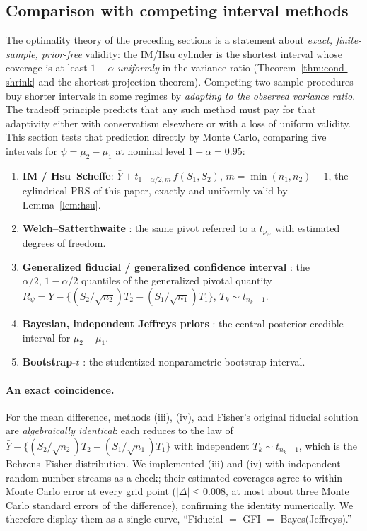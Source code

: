 \documentclass[12pt]{article}
\begin{document}
\subsection{Comparison with competing interval methods}
\label{sec:comparison}

The optimality theory of the preceding sections is a statement
about \emph{exact, finite-sample, prior-free} validity: the IM/Hsu
cylinder is the shortest interval whose coverage is at least \(1-\alpha\)
\emph{uniformly} in the variance ratio (Theorem~\ref{thm:cond-shrink} and the
shortest-projection theorem).  Competing two-sample procedures buy shorter
intervals in some regimes by \emph{adapting to the observed variance ratio}.  The
tradeoff principle predicts that any such method must pay for that adaptivity
either with conservatism elsewhere or with a loss of uniform validity.  This
section tests that prediction directly by Monte Carlo, comparing five intervals
for \(\psi=\mu_2-\mu_1\) at nominal level \(1-\alpha=0.95\):

\begin{enumerate}[label=(\roman*),itemsep=2pt]
\item \textbf{IM / Hsu--Scheffe}: \(\bar Y\pm t_{1-\alpha/2,m}\,f(S_1,S_2)\),
      \(m=\min(n_1,n_2)-1\), the cylindrical PRS of this paper, exactly and
      uniformly valid by Lemma~\ref{lem:hsu}.
\item \textbf{Welch--Satterthwaite} \citep{Welch1947,Satterthwaite1946}: the same
      pivot referred to a \(t_{\nu_W}\) with estimated degrees of freedom.
\item \textbf{Generalized fiducial / generalized confidence interval}
      \citep{Weerahandi1993}: the \(\alpha/2,\,1-\alpha/2\) quantiles of the
      generalized pivotal quantity
      \(R_\psi=\bar Y-\{(S_2/\sqrt{n_2})T_2-(S_1/\sqrt{n_1})T_1\}\),
      \(T_k\sim t_{n_k-1}\).
\item \textbf{Bayesian, independent Jeffreys priors} \citep{GhoshKim2001}: the
      central posterior credible interval for \(\mu_2-\mu_1\).
\item \textbf{Bootstrap-\(t\)} \citep{EfronTibshirani1993}: the studentized
      nonparametric bootstrap interval.
\end{enumerate}

\paragraph{An exact coincidence.}
For the mean difference, methods (iii), (iv), and Fisher's original fiducial
solution \citep{Fisher1935} are \emph{algebraically identical}: each reduces to
the law of \(\bar Y-\{(S_2/\sqrt{n_2})T_2-(S_1/\sqrt{n_1})T_1\}\) with
independent \(T_k\sim t_{n_k-1}\), which is the Behrens--Fisher distribution.  We
implemented (iii) and (iv) with independent random number streams as a check;
their estimated coverages agree to within Monte Carlo error at every grid point
(\(|\Delta|\le 0.008\), at most about three Monte Carlo standard errors of the
difference), confirming the identity numerically.
We therefore display them as a single curve, ``Fiducial \(=\) GFI \(=\)
Bayes(Jeffreys).''
\end{document}
